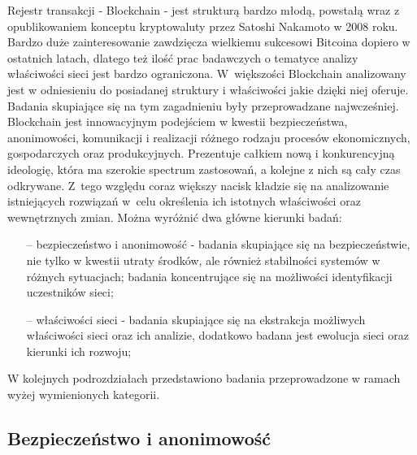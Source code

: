 \documentclass[12pt, twoside, final, openany]{mgr}
\begin{document}
\indent Rejestr transakcji - Blockchain - jest strukturą bardzo młodą, powstałą wraz z opublikowaniem konceptu kryptowaluty przez Satoshi Nakamoto w 2008 roku\cite{nakamoto2008bitcoin}. Bardzo duże zainteresowanie zawdzięcza wielkiemu sukcesowi Bitcoina dopiero w ostatnich latach, dlatego też ilość prac badawczych o tematyce analizy właściwości sieci jest bardzo ograniczona. W~większości Blockchain analizowany jest w odniesieniu do posiadanej struktury i właściwości jakie dzięki niej oferuje. Badania skupiające się na tym zagadnieniu były przeprowadzane najwcześniej. Blockchain jest innowacyjnym podejściem w kwestii bezpieczeństwa, anonimowości, komunikacji i realizacji różnego rodzaju procesów ekonomicznych, gospodarczych oraz produkcyjnych. Prezentuje całkiem nową i konkurencyjną ideologię, która ma szerokie spectrum zastosowań, a kolejne z nich są cały czas odkrywane. Z~tego względu coraz większy nacisk kładzie się na analizowanie istniejących rozwiązań w~celu określenia ich istotnych właściwości oraz wewnętrznych zmian. Można wyróżnić dwa główne kierunki badań: 
\begin{itemize}
\item[--] bezpieczeństwo i anonimowość -  badania skupiające się na bezpieczeństwie, nie tylko w kwestii utraty środków, ale również stabilności systemów w różnych sytuacjach; badania koncentrujące się na możliwości identyfikacji uczestników sieci; 
\item[--] właściwości sieci - badania skupiające się na ekstrakcja możliwych właściwości sieci oraz ich analizie, dodatkowo badana jest ewolucja sieci oraz kierunki ich rozwoju;
\end{itemize}

\indent W kolejnych podrozdziałach przedstawiono badania przeprowadzone w ramach wyżej wymienionych kategorii.

\subsection{Bezpieczeństwo i anonimowość}
\end{document}
